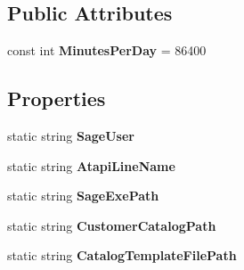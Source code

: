 \subsection*{Public Attributes}
\begin{DoxyCompactItemize}
\item 
const int {\bfseries Minutes\+Per\+Day} = 86400\hypertarget{class_products_1_1_common_1_1_global_a0f7424524818e171991baf4b1a570cb2}{}\label{class_products_1_1_common_1_1_global_a0f7424524818e171991baf4b1a570cb2}

\end{DoxyCompactItemize}
\subsection*{Properties}
\begin{DoxyCompactItemize}
\item 
static string {\bfseries Sage\+User}\hypertarget{class_products_1_1_common_1_1_global_a197f8042ffce4e4cb4db12e552d7f18e}{}\label{class_products_1_1_common_1_1_global_a197f8042ffce4e4cb4db12e552d7f18e}

\item 
static string {\bfseries Atapi\+Line\+Name}\hypertarget{class_products_1_1_common_1_1_global_a68daeec0644be630607c9cf4b3d6afea}{}\label{class_products_1_1_common_1_1_global_a68daeec0644be630607c9cf4b3d6afea}

\item 
static string {\bfseries Sage\+Exe\+Path}\hypertarget{class_products_1_1_common_1_1_global_ab7babd2bda8f40a901ec7b3b4e4ed3c2}{}\label{class_products_1_1_common_1_1_global_ab7babd2bda8f40a901ec7b3b4e4ed3c2}

\item 
static string {\bfseries Customer\+Catalog\+Path}\hypertarget{class_products_1_1_common_1_1_global_a8f853dd673166071a5200a082b6c2aec}{}\label{class_products_1_1_common_1_1_global_a8f853dd673166071a5200a082b6c2aec}

\item 
static string {\bfseries Catalog\+Template\+File\+Path}\hypertarget{class_products_1_1_common_1_1_global_a4563273f270d982f401ecbe5f080db30}{}\label{class_products_1_1_common_1_1_global_a4563273f270d982f401ecbe5f080db30}


\end{DoxyCompactItemize}
